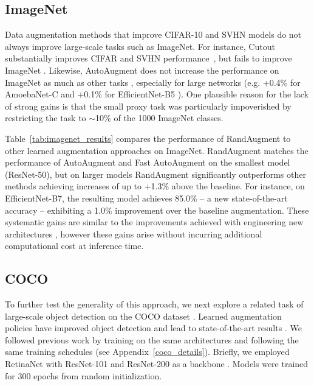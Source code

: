 \subsection{ImageNet}


Data augmentation methods that improve CIFAR-10 and SVHN models do not always improve large-scale tasks such as ImageNet. For instance, Cutout substantially improves CIFAR and SVHN performance~\cite{cutout2017}, but fails to improve ImageNet \cite{lopes2019improving}. Likewise, AutoAugment does not increase the performance on ImageNet as much as other tasks \cite{cubuk2018autoaugment}, especially for large networks (e.g. +0.4\% for AmoebaNet-C \cite{cubuk2018autoaugment} and +0.1\% for EfficientNet-B5 \cite{tan2019efficientnet}).
One plausible reason for the lack of strong gains is that the small proxy task was particularly impoverished by restricting the task to $\sim$10\% of the 1000 ImageNet classes.

Table~\ref{tab:imagenet_results} compares the performance of RandAugment to other learned augmentation approaches on ImageNet. RandAugment matches the performance of AutoAugment and Fast AutoAugment on the smallest model (ResNet-50), but on larger models RandAugment significantly outperforms other methods achieving increases of up to +1.3\% above the baseline. For instance, on EfficientNet-B7, the resulting model achieves 85.0\% -- a new state-of-the-art accuracy -- exhibiting a 1.0\% improvement over the baseline augmentation. These systematic gains are similar to the improvements achieved with engineering new architectures \cite{zoph2017learning,liu2017progressive}, however these gains arise without incurring  additional computational cost at inference time. 

\subsection{COCO}
To further test the generality of this approach, we next explore a related task of large-scale object detection on the COCO dataset \cite{lin2014microsoft}. 
Learned augmentation policies have improved object detection and lead to state-of-the-art results \cite{zoph2019learning}. We followed previous work by training on the same architectures and following the same training schedules (see Appendix~\ref{coco_details}). Briefly, we employed RetinaNet \cite{lin2017focal} with ResNet-101 and ResNet-200 as a backbone \cite{he2016deep}. Models were trained for 300 epochs from random initialization.

